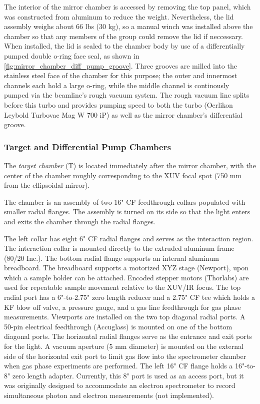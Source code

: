 The interior of the mirror chamber is accessed by removing the top panel, which was constructed from aluminum to reduce the weight. Nevertheless, the lid assembly weighs about 66 lbs (30 kg), so a manual winch was installed above the chamber so that any members of the group could remove the lid if neccessary. When installed, the lid is sealed to the chamber body by use of a differentially pumped double o-ring face seal, as shown in \cref{fig:mirror_chamber_diff_pump_groove}. Three grooves are milled into the stainless steel face of the chamber for this purpose; the outer and innermost channels each hold a large o-ring, while the middle channel is continously pumped via the beamline's rough vacuum system. The rough vacuum line splits before this turbo and provides pumping speed to both the turbo (Oerlikon Leybold Turbovac Mag W 700 iP) as well as the mirror chamber's differential groove.

\subsubsection{Target and  Differential Pump Chambers}

The \textit{target chamber} (T) is located immediately after the mirror chamber, with the center of the chamber roughly corresponding to the XUV focal spot (750 mm from the ellipsoidal mirror).

The chamber is an assembly of two 16" CF feedthrough collars populated with smaller radial flanges. The assembly is turned on its side so that the light enters and exits the chamber through the radial flanges.

The left collar has eight 6" CF radial flanges and serves as the interaction region. The interaction collar is mounted directly to the extruded aluminum frame (80/20 Inc.). The bottom radial flange supports an internal aluminum breadboard. The breadboard supports a motorized XYZ stage (Newport), upon which a sample holder can be attached. Encoded stepper motors (Thorlabs) are used for repeatable sample movement relative to the XUV/IR focus. The top radial port has a 6"-to-2.75" zero length reducer and a 2.75" CF tee which holds a KF blow off valve, a pressure gauge, and a gas line feedthrough for gas phase measurements. Viewports are installed on the two top diagonal radial ports. A 50-pin electrical feedthrough (Accuglass) is mounted on one of the bottom diagonal ports. The horizontal radial flanges serve as the entrance and exit ports for the light. A vacuum aperture (5 mm diameter) is mounted on the external side of the horizontal exit port to limit gas flow into the spectrometer chamber when gas phase experiments are performed. The left 16" CF flange holds a 16"-to-8" zero length adapter. Currently, this 8" port is used as an access port, but it was originally designed to accommodate an electron spectrometer to record simultaneous photon and electron measurements (not implemented).

